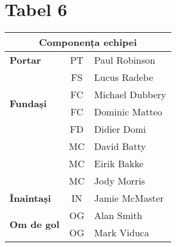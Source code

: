 \documentclass[9pt,a4paper]{article}
\begin{document}
\section*{Tabel 6}

\begin{tabular}{|l|c|l|}
    \hline
    \multicolumn{3}{|c|}{\bf Componența echipei}                               \\
    \hline
    \rowcolor{orange} \bf Portar                        & PT & Paul Robinson   \\
    \hline
    \multirow{4}{*}{\bf Fundași}                        & FS & Lucus Radebe    \\
                                                        & FC & Michael Dubbery \\
                                                        & FC & Dominic Matteo  \\
                                                        & FD & Didier Domi     \\
    \hline
    \rowcolor{gray}                                     & MC & David Batty     \\
    \rowcolor{gray} \multicolumn{1}{|c|}{\bf Mijlocași} & MC & Eirik Bakke     \\
    \rowcolor{gray}                                     & MC & Jody Morris     \\
    \hline
    \bf Înaintași                                       & IN & Jamie McMaster  \\
    \hline
    \multirow{2}{*}{\bf Om de gol}                      & OG & Alan Smith      \\
                                                        & OG & Mark Viduca     \\
    \hline
\end{tabular}
\end{document}
